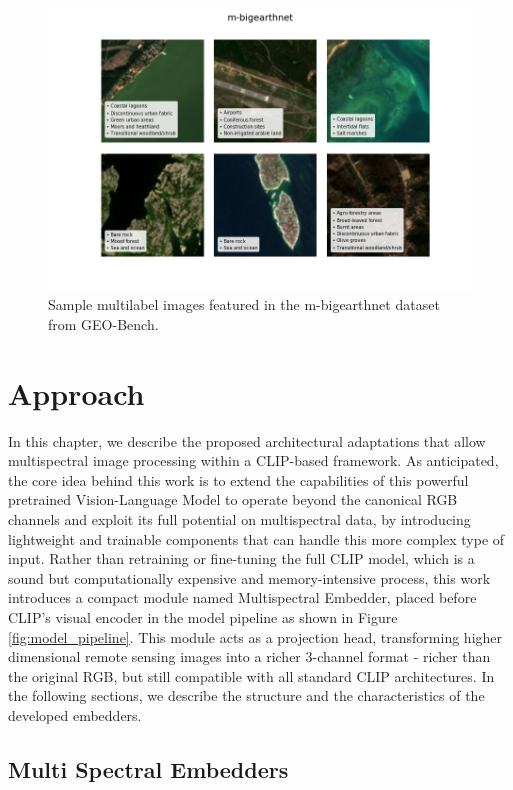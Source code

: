 \documentclass[a4paper, oneside, english]{sapthesis} %
\begin{document}
\begin{figure}[h]
    \centering
    \includegraphics[width=\textwidth]{img/m-bigearthnet_image_grid.png}
    \caption{Sample multilabel images featured in the m-bigearthnet dataset from GEO-Bench.}
    \label{fig:bengrid}
\end{figure}


\chapter{Approach} %

In this chapter, we describe the proposed architectural adaptations that allow multispectral image processing within a CLIP-based framework. As anticipated, the core idea behind this work is to extend the capabilities of this powerful pretrained Vision-Language Model to operate beyond the canonical RGB channels and exploit its full potential on multispectral data, by introducing lightweight and trainable components that can handle this more complex type of input.
Rather than retraining or fine-tuning the full CLIP model, which is a sound but computationally expensive and memory-intensive process, this work introduces a compact module named Multispectral Embedder, placed before CLIP’s visual encoder in the model pipeline as shown in Figure \ref{fig:model_pipeline}. This module acts as a projection head, transforming higher dimensional remote sensing images into a richer 3-channel format - richer than the original RGB, but still compatible with all standard CLIP architectures. In the following sections, we describe the structure and the characteristics of the developed embedders. 

\section{Multi Spectral Embedders}
\end{document}
